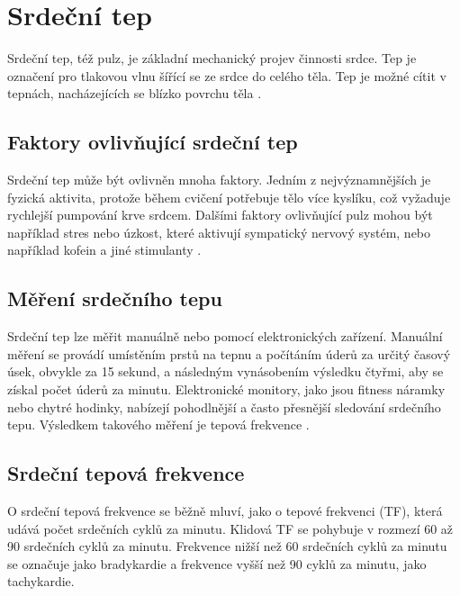 \chapter{Srdeční tep}

Srdeční tep, též pulz, je základní mechanický projev činnosti srdce.
Tep je označení pro tlakovou vlnu šířící se ze srdce do celého těla.
Tep je možné cítit v tepnách, nacházejících se blízko povrchu těla \cite{ucebniceFyziologie}.

\section{Faktory ovlivňující srdeční tep}

Srdeční tep může být ovlivněn mnoha faktory.
Jedním z nejvýznamnějších je fyzická aktivita, protože během cvičení potřebuje tělo více kyslíku, což vyžaduje rychlejší pumpování krve srdcem.
Dalšími faktory ovlivňující pulz mohou být například stres nebo úzkost, které aktivují sympatický nervový systém, nebo například kofein a jiné stimulanty \cite{faktoryOvlivnujiciTep}.

\section{Měření srdečního tepu}

Srdeční tep lze měřit manuálně nebo pomocí elektronických zařízení.
Manuální měření se provádí umístěním prstů na tepnu a počítáním úderů za určitý časový úsek, obvykle za 15 sekund, a následným vynásobením výsledku čtyřmi, aby se získal počet úderů za minutu.
Elektronické monitory, jako jsou fitness náramky nebo chytré hodinky, nabízejí pohodlnější a často přesnější sledování srdečního tepu.
Výsledkem takového měření je tepová frekvence \cite{ENIKÖ}.

\section{Srdeční tepová frekvence}

O srdeční tepová frekvence se běžně mluví, jako o tepové frekvenci (\acs{TF}), která udává počet srdečních cyklů za minutu.
Klidová \acs{TF} se pohybuje v rozmezí 60 až 90 srdečních cyklů za minutu.
Frekvence nižší než 60 srdečních cyklů za minutu se označuje jako bradykardie a frekvence vyšší než 90 cyklů za minutu, jako tachykardie.

